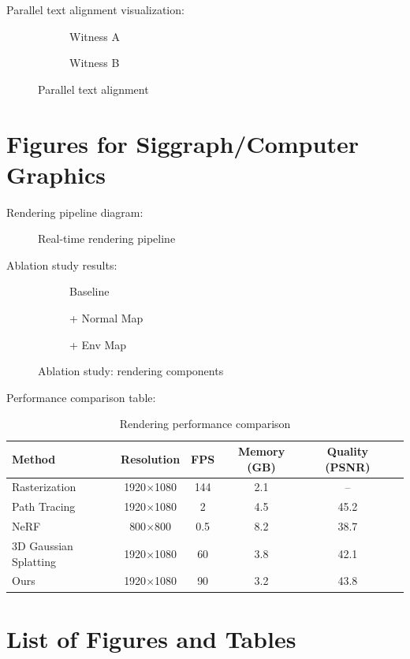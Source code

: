 \documentclass[12pt,a4paper]{article}
\begin{document}
Parallel text alignment visualization:
\begin{figure}[htbp]
\centering
\begin{subfigure}[b]{0.45\textwidth}
\centering
\fbox{\parbox{5cm}{\centering [Witness A]}}
\caption{Witness A}\label{subfig:wit-a}
\end{subfigure}
\hfill
\begin{subfigure}[b]{0.45\textwidth}
\centering
\fbox{\parbox{5cm}{\centering [Witness B]}}
\caption{Witness B}\label{subfig:wit-b}
\end{subfigure}
\caption{Parallel text alignment}\label{fig:parallel}
\end{figure}

\section{Figures for Siggraph/Computer Graphics}\label{sec:cg-figures}
Rendering pipeline diagram:
\begin{figure}[htbp]
\centering
{}
\caption{Real-time rendering pipeline}\label{fig:pipeline}
\end{figure}

Ablation study results:
\begin{figure}[htbp]
\centering
\begin{subfigure}[b]{0.3\textwidth}
\centering
\fbox{\parbox{4cm}{\centering [Baseline]}}
\caption{Baseline}\label{subfig:base}
\end{subfigure}
\hfill
\begin{subfigure}[b]{0.3\textwidth}
\centering
{}
\caption{+ Normal Map}\label{subfig:normal}
\end{subfigure}
\hfill
\begin{subfigure}[b]{0.3\textwidth}
\centering
{}
\caption{+ Env Map}\label{subfig:env}
\end{subfigure}
\caption{Ablation study: rendering components}\label{fig:ablation}
\end{figure}

Performance comparison table:
\begin{table}[htbp]
\centering
\caption{Rendering performance comparison}\label{tab:perf}
\begin{tabular}{lccccc}
\toprule
Method & Resolution & FPS & Memory (GB) & Quality (PSNR) \\
\midrule
Rasterization & 1920$\times$1080 & 144 & 2.1 & -- \\
Path Tracing & 1920$\times$1080 & 2 & 4.5 & 45.2 \\
NeRF & 800$\times$800 & 0.5 & 8.2 & 38.7 \\
3D Gaussian Splatting & 1920$\times$1080 & 60 & 3.8 & 42.1 \\
Ours & 1920$\times$1080 & 90 & 3.2 & 43.8 \\
\bottomrule
\end{tabular}
\end{table}

\section{List of Figures and Tables}\label{sec:lists}
\listoffigures
\listoftables
\end{document}
